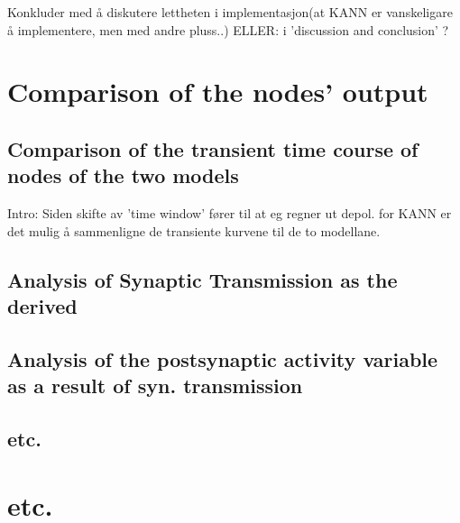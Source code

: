 	Konkluder med å diskutere lettheten i implementasjon(at KANN er vanskeligare å implementere, men med andre pluss..) 			ELLER:   i 'discussion and conclusion' ?

\section{Comparison of the nodes' output}
	\subsection{Comparison of the transient time course of nodes of the two models}
		Intro: Siden skifte av 'time window' fører til at eg regner ut depol. for KANN er det mulig å sammenligne de transiente kurvene til de to modellane.
	\subsection{Analysis of Synaptic Transmission as the derived}
	\subsection{Analysis of the postsynaptic activity variable as a result of syn. transmission} %
	\subsection{etc.}
\section{etc.}
